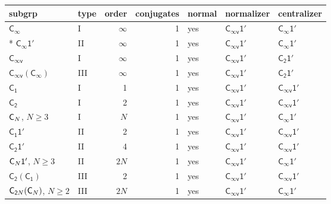 \documentclass[10pt,a4paper]{article}
\makeatletter
\def\grouprule#1#2{\noalign{\marks\LTgroupmarks{\the\belowrulesep}\nobreak\vskip#1%
  \vskip\aboverulesep}\multispan\LT@cols\unskip{\leaders\hrule\@height#2\hfill\kern\z@}\cr
  \noalign{\penalty\LTrulebreak\vskip\belowrulesep\global\@lastruleclass\z@}}
\numberwithin{equation}{section}
\newcommand{\grp}[1]{\mathsf{#1}}
\makeatother
\begin{document}
{\small\begin{longtable}{@{}llrrlll@{}}\toprule
subgrp & type & order & conjugates & normal & normalizer & centralizer\\\midrule\endhead
\bottomrule\endfoot\endlastfoot
\href{../../../rotation/data/pdf/Cinf.pdf}{$\grp{C_{\infty}}$} & I & $\infty$ & 1 & yes & \href{Cinfv-1p.pdf}{$\grp{C_{\infty v}1'}$} & \href{Cinf-1p.pdf}{$\grp{C_{\infty}1'}$}\\*
\href{Cinf-1p.pdf}{$\grp{C_{\infty}1'}$} & II & $\infty$ & 1 & yes & \href{Cinfv-1p.pdf}{$\grp{C_{\infty v}1'}$} & \href{Cinf-1p.pdf}{$\grp{C_{\infty}1'}$}\\
\href{../../../rotation/data/pdf/Cinfv.pdf}{$\grp{C_{\infty v}}$} & I & $\infty$ & 1 & yes & \href{Cinfv-1p.pdf}{$\grp{C_{\infty v}1'}$} & \href{C2-1p.pdf}{$\grp{C_{2}1'}$}\\
\href{Cinfv-Cinf.pdf}{$\grp{C_{\infty v}}(\grp{C_{\infty}})$} & III & $\infty$ & 1 & yes & \href{Cinfv-1p.pdf}{$\grp{C_{\infty v}1'}$} & \href{C2-1p.pdf}{$\grp{C_{2}1'}$}\\
\grouprule{0pt}{\lightrulewidth}
\href{../../../rotation/data/pdf/C1.pdf}{$\grp{C_{1}}$} & I & 1 & 1 & yes & \href{Cinfv-1p.pdf}{$\grp{C_{\infty v}1'}$} & \href{Cinfv-1p.pdf}{$\grp{C_{\infty v}1'}$}\\
\href{../../../rotation/data/pdf/C2.pdf}{$\grp{C_{2}}$} & I & 2 & 1 & yes & \href{Cinfv-1p.pdf}{$\grp{C_{\infty v}1'}$} & \href{Cinfv-1p.pdf}{$\grp{C_{\infty v}1'}$}\\
$\grp{C_{\mathnormal{N}}}$, $N \ge 3$ & I & $N$ & 1 & yes & \href{Cinfv-1p.pdf}{$\grp{C_{\infty v}1'}$} & \href{Cinf-1p.pdf}{$\grp{C_{\infty}1'}$}\\
\href{C1-1p.pdf}{$\grp{C_{1}1'}$} & II & 2 & 1 & yes & \href{Cinfv-1p.pdf}{$\grp{C_{\infty v}1'}$} & \href{Cinfv-1p.pdf}{$\grp{C_{\infty v}1'}$}\\
\href{C2-1p.pdf}{$\grp{C_{2}1'}$} & II & 4 & 1 & yes & \href{Cinfv-1p.pdf}{$\grp{C_{\infty v}1'}$} & \href{Cinfv-1p.pdf}{$\grp{C_{\infty v}1'}$}\\
$\grp{C_{\mathnormal{N}}1'}$, $N \ge 3$ & II & $2N$ & 1 & yes & \href{Cinfv-1p.pdf}{$\grp{C_{\infty v}1'}$} & \href{Cinf-1p.pdf}{$\grp{C_{\infty}1'}$}\\
\href{C2-C1.pdf}{$\grp{C_{2}}(\grp{C_{1}})$} & III & 2 & 1 & yes & \href{Cinfv-1p.pdf}{$\grp{C_{\infty v}1'}$} & \href{Cinfv-1p.pdf}{$\grp{C_{\infty v}1'}$}\\
$\grp{C_{2\mathnormal{N}}}(\grp{C_{\mathnormal{N}}})$, $N \ge 2$ & III & $2N$ & 1 & yes & \href{Cinfv-1p.pdf}{$\grp{C_{\infty v}1'}$} & \href{Cinf-1p.pdf}{$\grp{C_{\infty}1'}$}\\

\end{longtable}}
\end{document}

